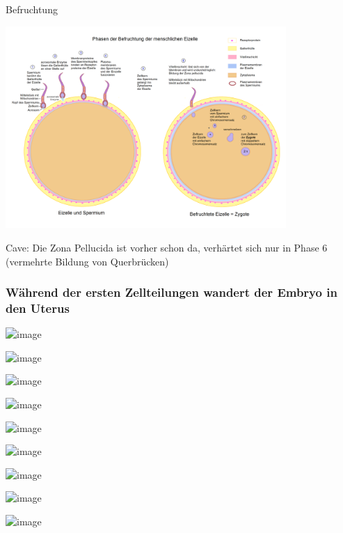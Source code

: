 \documentclass{beamer}
\begin{document}
\begin{frame}{Befruchtung}

\begin{center}
    \includegraphics[width=0.8\textwidth]{Befruchtung_-_Zygote.png}
\end{center}


\begin{tiny}
Cave: Die Zona Pellucida ist vorher schon da, verhärtet sich nur in Phase 6 (vermehrte Bildung von Querbrücken)
\end{tiny}    
\end{frame}



\begin{frame}
\frametitle{Während der ersten Zellteilungen wandert der Embryo in den Uterus}

\begin{center}
\includegraphics<1>[width=0.8\textwidth]{Human_Fertilization_Day0C.png}

\includegraphics<2>[width=0.8\textwidth]{Human_Fertilization_Day1.png}

\includegraphics<3>[width=0.8\textwidth]{Human_Fertilization_Day2.png}

\includegraphics<4>[width=0.8\textwidth]{Human_Fertilization_Day3A.png}

\includegraphics<5>[width=0.8\textwidth]{Human_Fertilization_Day3B.png}

\includegraphics<6>[width=0.8\textwidth]{Human_Fertilization_Day4.png}

\includegraphics<7>[width=0.8\textwidth]{Human_Fertilization_Day5.png}

\includegraphics<8>[width=0.8\textwidth]{Human_Fertilization_Day6.png}

\includegraphics<9>[width=0.8\textwidth]{Human_Fertilization.png}

\end{center}


\end{frame}
\end{document}
